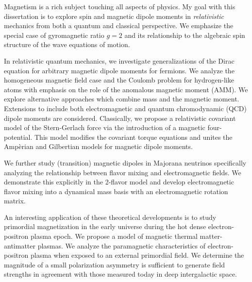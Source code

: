 

Magnetism is a rich subject touching all aspects of physics. My goal with this dissertation is to explore spin and magnetic dipole moments in \emph{relativistic} mechanics from both a quantum and classical perspective. We emphasize the special case of gyromagnetic ratio $g\!=\!2$ and its relationship to the algebraic spin structure of the wave equations of motion.

In relativistic quantum mechanics, we investigate generalizations of the Dirac equation for arbitrary magnetic dipole moments for fermions. We analyze the homogeneous magnetic field case and the Coulomb problem for hydrogen-like atoms with emphasis on the role of the anomalous magnetic moment (AMM). We explore alternative approaches which combine mass and the magnetic moment. Extensions to include both electromagnetic and quantum chromodynamic (QCD) dipole moments are considered. Classically, we propose a relativistic covariant model of the Stern-Gerlach force via the introduction of a magnetic four-potential. This model modifies the covariant torque equations and unites the Amp{\`e}rian and Gilbertian models for magnetic dipole moments.

We further study (transition) magnetic dipoles in Majorana neutrinos specifically analyzing the relationship between flavor mixing and electromagnetic fields. We demonstrate this explicitly in the 2-flavor model and develop electromagnetic flavor mixing into a dynamical mass basis with an electromagnetic rotation matrix.

An interesting application of these theoretical developments is to study primordial magnetization in the early universe during the hot dense electron-positron plasma epoch. We propose a model of magnetic thermal matter-antimatter plasmas. We analyze the paramagnetic characteristics of electron-positron plasma when exposed to an external primordial field. We determine the magnitude of a small polarization asymmetry is sufficient to generate field strengths in agreement with those measured today in deep intergalactic space.